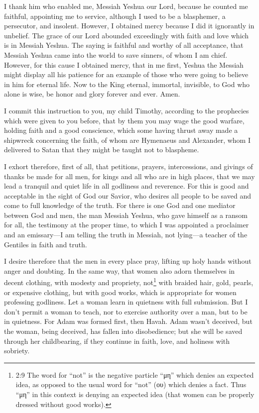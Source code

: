 \myverse{}I thank him who enabled me, Messiah Yeshua our Lord, because
he counted me faithful, appointing me to service,
\myverse{}although I used to be a blasphemer, a persecutor, and insolent. However, I
obtained mercy because I did it ignorantly in unbelief.
\myverse{}The grace of our Lord abounded exceedingly with faith and love which is in
Messiah Yeshua.
\myverse{}The saying is faithful and worthy of all acceptance, that Messiah Yeshua came
into the world to save sinners, of whom I am chief.
\myverse{}However, for this cause I obtained mercy, that in me first, Yeshua the Messiah
might display all his patience for an example of those who were going to believe in him for eternal life.
\myverse{}Now to the King eternal, immortal, invisible, to God who alone is wise, be
honor and glory forever and ever. Amen.

\myverse{}I commit this instruction to you, my child Timothy, according
to the prophecies which were given to you before, that by them you may wage the good warfare,
\myverse{}holding faith and a good conscience, which some having thrust away made a
shipwreck concerning the faith,
\myverse{}of whom are Hymenaeus and Alexander, whom I delivered to Satan that they might
be taught not to blaspheme.


\mychapter{} \myverse*{}I exhort therefore, first of all, that petitions, prayers, intercessions,
and givings of thanks be made for all men,
\myverse{}for kings and all who are in high places, that we may lead a tranquil and quiet
life in all godliness and reverence.
\myverse{}For this is good and acceptable in the sight of God our Savior,
\myverse{}who desires all people to be saved and come to full knowledge of the truth.
\myverse{}For there is one God and one mediator between God and men, the man Messiah Yeshua,
\myverse{}who gave himself as a ransom for all, the testimony at the proper time,
\myverse{}to which I was appointed a proclaimer and an emissary—I am telling the truth
in Messiah, not lying—a teacher of the Gentiles in faith and truth.

\myverse{}I desire therefore that the men in every place pray, lifting up
holy hands without anger and doubting.
\myverse{}In the same way, that women also adorn themselves in decent clothing, with modesty
and propriety, not\footnote{2:9 The word for “not” is the negative particle “μη” which denies an expected idea, as opposed to
	the usual word for “not” (ου) which denies a fact. Thus “μη” in this context is denying an expected idea
	(that women can be properly dressed without good works).} with braided hair, gold, pearls, or
expensive clothing,
\myverse{}but with good works, which is appropriate for women professing godliness.
\myverse{}Let a woman learn in quietness with full submission.
\myverse{}But I don’t permit a woman to teach, nor to exercise authority over a man,
but to be in quietness.
\myverse{}For Adam was formed first, then Havah.
\myverse{}Adam wasn’t deceived, but the woman, being deceived, has fallen into disobedience;
\myverse{}but she will be saved through her childbearing, if they continue in faith,
love, and holiness with sobriety.



